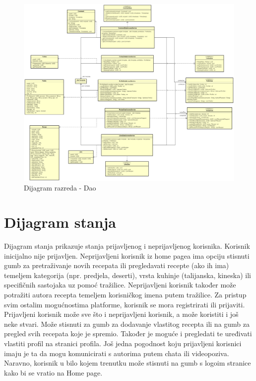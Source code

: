 \begin{figure}[H]
	\centering
	\includegraphics[width=1\linewidth]{slike/dijagrami/Dao.png}
	\caption{Dijagram razreda - Dao}
	\label{fig:enter-label}
\end{figure}
\eject
			
			
			
			
		
		\section{Dijagram stanja}

		\noindent Dijagram stanja prikazuje stanja prijavljenog i neprijavljenog korisnika. Korisnik inicijalno nije prijavljen. Neprijavljeni korisnik iz home pagea ima opciju stisnuti gumb za pretraživanje novih recepata ili pregledavati recepte (ako ih ima) temeljem kategorija (npr. predjela, deserti), vrsta kuhinje (talijanska, kineska) ili specifičnih sastojaka uz pomoć tražilice. Neprijavljeni korisnik također može potražiti autora recepta temeljem korisničkog imena putem tražilice. Za pristup svim ostalim mogućnostima platforme, korisnik se mora registrirati ili prijaviti. Prijavljeni korisnik može sve što i neprijavljeni korisnik, a može koristiti i još neke stvari. Može stisnuti za gumb za dodavanje vlastitog recepta ili na gumb za pregled svih recepata koje je spremio. Također je moguće i pregledati te uređivati vlastiti profil na stranici profila. Još jedna pogodnost koju prijavljeni korisnici imaju je ta da mogu komunicirati s autorima putem chata ili videopoziva. Naravno, korisnik u bilo kojem trenutku može stisnuti na gumb s logoim stranice kako bi se vratio na Home page. 

